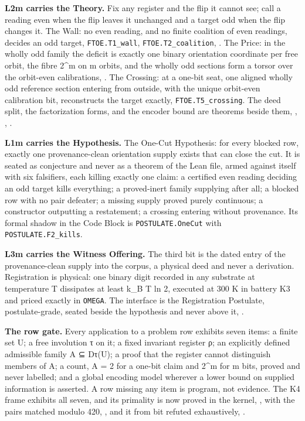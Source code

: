 \documentclass[10pt,twocolumn]{article}
\begin{document}
\textbf{L2m carries the Theory.} Fix any register and the flip it cannot
see; call a reading even when the flip leaves it unchanged and a target
odd when the flip changes it. The Wall: no even reading, and no finite
coalition of even readings, decides an odd target,
\texttt{FTOE.T1\_wall}, \texttt{FTOE.T2\_coalition},
\texttt{}. The Price: in the wholly
odd family the deficit is exactly one binary orientation coordinate per
free orbit, the fibre 2\^{}m on m orbits, and the wholly odd sections
form a torsor over the orbit-even calibrations,
\texttt{}. The Crossing: at a
one-bit seat, one aligned wholly odd reference section entering from
outside, with the unique orbit-even calibration bit, reconstructs the
target exactly, \texttt{FTOE.T5\_crossing}. The deed split, the
factorization forms, and the encoder bound are theorems beside them,
\texttt{},
\texttt{},
\texttt{}.

\textbf{L1m carries the Hypothesis.} The One-Cut Hypothesis: for every
blocked row, exactly one provenance-clean orientation supply exists that
can close the cut. It is seated as conjecture and never as a theorem of
the Lean file, armed against itself with six falsifiers, each killing
exactly one claim: a certified even reading deciding an odd target kills
everything; a proved-inert family supplying after all; a blocked row
with no pair defeater; a missing supply proved purely continuous; a
constructor outputting a restatement; a crossing entering without
provenance. Its formal shadow in the Code Block is
\texttt{POSTULATE.OneCut} with \texttt{POSTULATE.F2\_kills}.

\textbf{L3m carries the Witness Offering.} The third bit is the dated
entry of the provenance-clean supply into the corpus, a physical deed
and never a derivation. Registration is physical: one binary digit
recorded in any substrate at temperature T dissipates at least k\_B T ln
2, executed at 300 K in battery K3 and priced exactly in \texttt{OMEGA}.
The interface is the Registration Postulate, postulate-grade, seated
beside the hypothesis and never above it,
\texttt{}.

\textbf{The row gate.} Every application to a problem row exhibits seven
items: a finite set U; a free involution τ on it; a fixed invariant
register ρ; an explicitly defined admissible family A ⊆ Dτ(U); a proof
that the register cannot distinguish members of A; a count,
\textbar A\textbar{} = 2 for a one-bit claim and 2\^{}m for m bits,
proved and never labelled; and a global encoding model wherever a lower
bound on supplied information is asserted. A row missing any item is
program, not evidence. The K4 frame exhibits all seven, and its
primality is now proved in the kernel,
\texttt{}, with the pairs matched
modulo 420, \texttt{}, and it from
bit refuted exhaustively,
\texttt{}.
\end{document}

